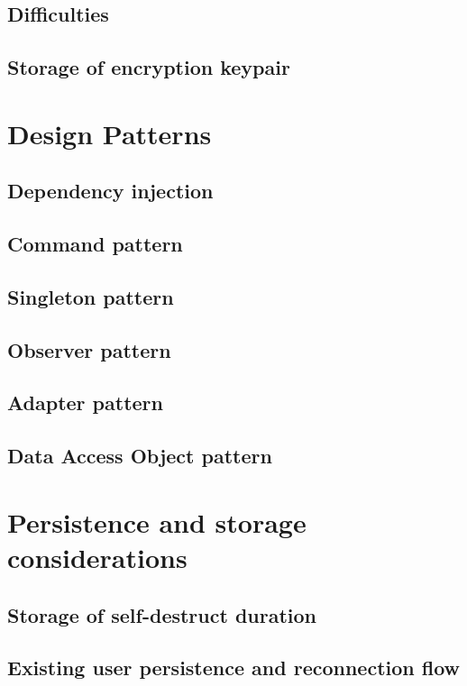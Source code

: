 \documentclass{mproj}
\begin{document}
\subsection{Difficulties}\label{encryptionDifficulties}

\subsection{Storage of encryption keypair}

\section{Design Patterns}

\subsection{Dependency injection}

\subsection{Command pattern}

\subsection{Singleton pattern}

\subsection{Observer pattern}

\subsection{Adapter pattern}

\subsection{Data Access Object pattern}

\section{Persistence and storage considerations}
\subsection{Storage of self-destruct duration}
\subsection{Existing user persistence and reconnection flow}
\end{document}
